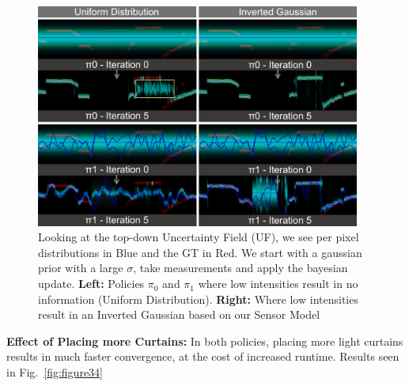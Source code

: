  \begin{figure}[h]
    \centering
    \begin{minipage}{0.5\textwidth}
        \centering
        \includegraphics[width=0.95\textwidth]{figures/combined2.png}
    \end{minipage}\hfill
    \centering
    \caption{Looking at the top-down Uncertainty Field (UF), we see per pixel distributions in Blue and the GT in Red. We start with a gaussian prior with a large $\sigma$, take measurements and apply the bayesian update. \textbf{Left:} Policies $\pi_{0}$ and $\pi_{1}$ where low intensities result in no information (Uniform Distribution). \textbf{Right:} Where low intensities result in an Inverted Gaussian based on our Sensor Model}
    \label{fig:invgau} 
\end{figure}

 \textbf{Effect of Placing more Curtains:} In both policies, placing more light curtains results in much faster convergence, at the cost of increased runtime. Results seen in Fig.~\ref{fig:figure34}

